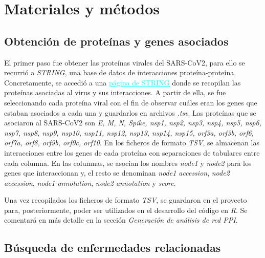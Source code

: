 \section{Materiales y métodos}

\subsection{Obtención de proteínas y genes asociados}

El primer paso fue obtener las proteínas virales del SARS-CoV2, para ello se recurrió a \textit{STRING}, una base de datos de interacciones proteína-proteína. Concretamente, se accedió a una \href{https://string-db.org/cgi/covid.pl}{\textcolor{Cyan}{\underline{página de STRING}}} donde se recopilan las proteínas asociadas al virus y sus interacciones. A partir de ella, se fue seleccionando cada proteína viral con el fin de observar cuáles eran los genes que estaban asociados a cada una y guardarlos en archivos \textit{.tsv}. Las proteínas que se asociaron al SARS-CoV2 son \textit{E, M, N, Spike, nsp1, nsp2, nsp3, nsp4, nsp5, nsp6, nsp7, nsp8, nsp9, nsp10, nsp11, nsp12, nsp13, nsp14, nsp15, orf3a, orf3b, orf6, orf7a, orf8, orf9b, orf9c, orf10}. En los ficheros de formato \textit{TSV}, se almacenan las interacciones entre los genes de cada proteína con separaciones de tabulares entre cada columna. En las columnas, se asocian los nombres \textit{node1} y \textit{node2} para los genes que interaccionan y, el resto se denominan \textit{node1 accession}, \textit{node2 accession}, \textit{node1 annotation}, \textit{node2 annotation} y \textit{score}. 

\newline

Una vez recopilados los ficheros de formato \textit{TSV}, se guardaron en el proyecto para, posteriormente, poder ser utilizados en el desarrollo del código en \textit{R}. Se comentará en más detalle en la sección \textit{Generación de análisis de red PPI}.

\subsection{Búsqueda de enfermedades relacionadas}

